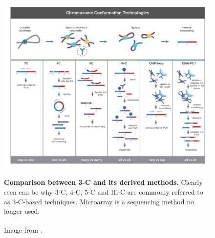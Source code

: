 
\begin{figure}[t]
    \begin{centering}
        {\includegraphics[scale=0.75]{figures/background/Chromosome_conformation_techniques.jpg}}
        \caption[Comparison between 3-C and its derived methods]
        {\textbf{Comparison between 3-C and its derived methods.}
        Clearly seen can be why 3-C, 4-C, 5-C and Hi-C are commonly referred to as
        3-C-based techniques. Microarray is a sequencing method no longer used.
        \\ \\ Image from \cite{Li2014}.}
        \label{fig:comparison3C}\label{fig:cct}
    \end{centering}
\end{figure}



